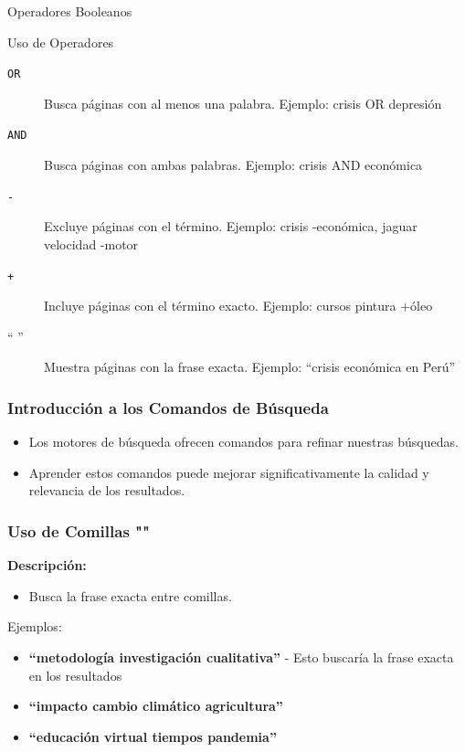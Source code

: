 \documentclass[
11pt, %
]{beamer}
\begin{document}
\begin{frame}{Operadores Booleanos}
	\begin{block}{Uso de Operadores}
		\begin{description}
			\item[\texttt{OR}]
			      Busca páginas con al menos una palabra. Ejemplo: \alert{crisis OR depresión}
			\item[\texttt{AND}]
			      Busca páginas con ambas palabras. Ejemplo: \alert{crisis AND económica}
			\item[\texttt{-}]
			      Excluye páginas con el término. Ejemplo: \alert{crisis -económica}, \alert{jaguar velocidad -motor}
			\item[\texttt{+}]
			      Incluye páginas con el término exacto. Ejemplo: \alert{cursos pintura +óleo}
			\item[`` '']
			      Muestra páginas con la frase exacta. Ejemplo: \alert{``crisis económica en Perú''}
		\end{description}
	\end{block}

\end{frame}

\begin{frame}
	\frametitle{Introducción a los Comandos de Búsqueda}
	\begin{itemize}
		\item Los motores de búsqueda ofrecen comandos para refinar nuestras búsquedas.
		\item Aprender estos comandos puede mejorar significativamente la calidad y
		      relevancia de los resultados.
	\end{itemize}
\end{frame}

\begin{frame}
	\frametitle{Uso de Comillas ""}
	\textbf{Descripción:}
	\begin{itemize}
		\item Busca la frase exacta entre comillas.
	\end{itemize}
	\begin{exampleblock}{Ejemplos:}
		\begin{itemize}
			\item \textbf{``metodología investigación cualitativa''} - Esto buscaría la frase exacta en los resultados
			\item \textbf{``impacto cambio climático agricultura''}
			\item \textbf{``educación virtual tiempos pandemia''}
		\end{itemize}
	\end{exampleblock}

\end{frame}
\end{document}
